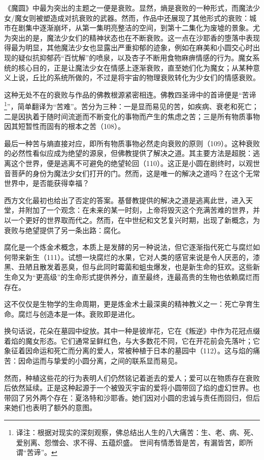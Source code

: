 《魔圆》中最为突出的主题之一便是衰败。显然，熵是衰败的一种形式，而魔法少女/魔女则被塑造成对抗衰败的武器。然而，作品中还展现了其他形式的衰败：城市在剧集中逐渐崩坏，从第一集明亮整洁的空间，到第十二集化为废墟的景象。尤为突出的是，魔法少女们的精神状态也在不断衰败。这一点在沙耶香的堕落中表现得最为明显，其他魔法少女也显露出严重抑郁的迹象，例如在麻美和小圆交心时出现的疑似抗抑郁药“百忧解”的喷泉，以及杏子不断用食物麻痹情感的行为。魔女系统的核心目的，正是让魔法少女在情感上逐渐衰败，直至她们化为魔女；从某种意义上说，丘比的系统所做的，不过是将宇宙的物理衰败转化为少女们的情感衰败。

这种无处不在的衰败与作品的佛教根源紧密相连。佛教四圣谛中的首谛便是“苦谛\footnote{译注：根据对现实的深刻观察，佛总结出人生的八大痛苦：生、老、病、死、爱别离、怨憎会、求不得、五蕴炽盛。 世间有情悉皆是苦，有漏皆苦，即所谓“苦谛”。}”，简单翻译为“苦难”。苦分为三种：一是显而易见的苦，如疾病、衰老和死亡；二是因执着于随时间流逝而不断变化的事物而产生的焦虑之苦；三是所有物质事物因其短暂性而固有的根本之苦（108）。

最后一种苦与熵直接对应，即所有物质事物必然走向衰败的原则（109）。这种衰败的必然性看似应成为绝望的源泉，但佛教提供了解决之道。其主要方法是超脱：逃离这个世界，便是逃离不可避免的绝望轮回（110）。这正是小圆在剧终时，以观世音菩萨的身份为魔法少女们打开的门。然而，这是唯一的解决之道吗？在这个无常世界中，是否能获得幸福？

西方文化最初也给出了否定的答案。基督教提供的解决之道是逃离此世，进入天堂，并附加了一个观念：在未来的某一时刻，上帝将毁灭这个充满苦难的世界，并以一个更好的世界取而代之。然而，在中世纪和文艺复兴时期，出现了新概念，为衰败与绝望提供了另一条出路：腐化。

腐化是一个炼金术概念，本质上是发酵的另一种说法，但它逐渐指代死亡与腐烂如何带来新生（111）。试想一块腐烂的水果，它对人类的感官来说是令人厌恶的，漆黑、丑陋且散发着恶臭，但与此同时霉菌和蛆虫爆发，也是新生命的狂欢。这些新生命又为“更高级”的生命形式提供养分，直至最终，连最高贵的生物也依赖腐烂而存在。

这不仅仅是生物学的生命周期，更是炼金术士最深奥的精神教义之一：死亡孕育生命。腐烂与创造本是一体。衰败即是进化。

换句话说，花朵在墓园中绽放。其中一种是彼岸花，它在《叛逆》中作为花冠点缀着焰的魔女形态。它们通常呈鲜红色，与大多数花不同，它在开花前会先落叶；它象征着因命运和死亡而分离的爱人，常被种植于日本的墓园中（112）。这与焰的痛苦：因命运而与挚爱的小圆分离，之间的联系显而易见。

然而，种植这些花的行为表明人们仍然铭记着逝去的爱人；爱可以在物质存在衰败后依然延续。正是这种起源于一个被毁灭宇宙的爱将小圆带回了焰的虚幻世界。也带回了另外两个存在：夏洛特和沙耶香。她们因对小圆的忠诚与责任而回归，但后来她们也表明了额外的意图。

